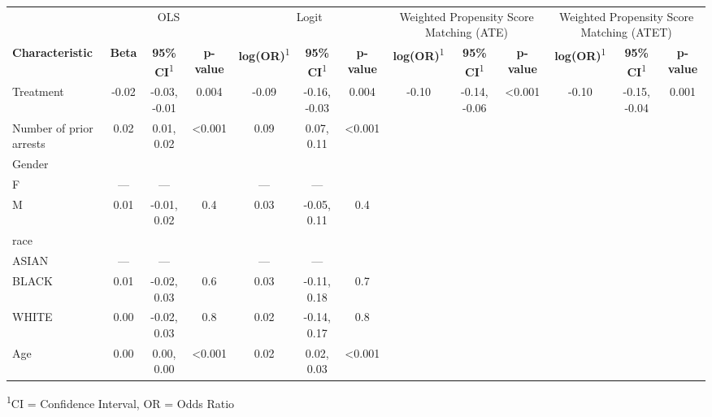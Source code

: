 \captionsetup[table]{labelformat=empty,skip=1pt}
\begin{longtable}{lcccccccccccc}
\toprule
& \multicolumn{3}{c}{OLS} & \multicolumn{3}{c}{Logit} & \multicolumn{3}{c}{Weighted Propensity Score Matching (ATE)} & \multicolumn{3}{c}{Weighted Propensity Score Matching (ATET)} \\ 
 \cmidrule(lr){2-4}\cmidrule(lr){5-7}\cmidrule(lr){8-10}\cmidrule(lr){11-13}
\textbf{Characteristic} & \textbf{Beta} & \textbf{95\% CI}\textsuperscript{1} & \textbf{p-value} & \textbf{log(OR)}\textsuperscript{1} & \textbf{95\% CI}\textsuperscript{1} & \textbf{p-value} & \textbf{log(OR)}\textsuperscript{1} & \textbf{95\% CI}\textsuperscript{1} & \textbf{p-value} & \textbf{log(OR)}\textsuperscript{1} & \textbf{95\% CI}\textsuperscript{1} & \textbf{p-value} \\ 
\midrule
Treatment & -0.02 & -0.03, -0.01 & 0.004 & -0.09 & -0.16, -0.03 & 0.004 & -0.10 & -0.14, -0.06 & <0.001 & -0.10 & -0.15, -0.04 & 0.001 \\ 
Number of prior arrests & 0.02 & 0.01, 0.02 & <0.001 & 0.09 & 0.07, 0.11 & <0.001 &  &  &  &  &  &  \\ 
Gender &  &  &  &  &  &  &  &  &  &  &  &  \\ 
F & --- & --- &  & --- & --- &  &  &  &  &  &  &  \\ 
M & 0.01 & -0.01, 0.02 & 0.4 & 0.03 & -0.05, 0.11 & 0.4 &  &  &  &  &  &  \\ 
race &  &  &  &  &  &  &  &  &  &  &  &  \\ 
ASIAN & --- & --- &  & --- & --- &  &  &  &  &  &  &  \\ 
BLACK & 0.01 & -0.02, 0.03 & 0.6 & 0.03 & -0.11, 0.18 & 0.7 &  &  &  &  &  &  \\ 
WHITE & 0.00 & -0.02, 0.03 & 0.8 & 0.02 & -0.14, 0.17 & 0.8 &  &  &  &  &  &  \\ 
Age & 0.00 & 0.00, 0.00 & <0.001 & 0.02 & 0.02, 0.03 & <0.001 &  &  &  &  &  &  \\ 
\bottomrule
\end{longtable}
\vspace{-5mm}
\begin{minipage}{\linewidth}
\textsuperscript{1}CI = Confidence Interval, OR = Odds Ratio \\ 
\end{minipage}

